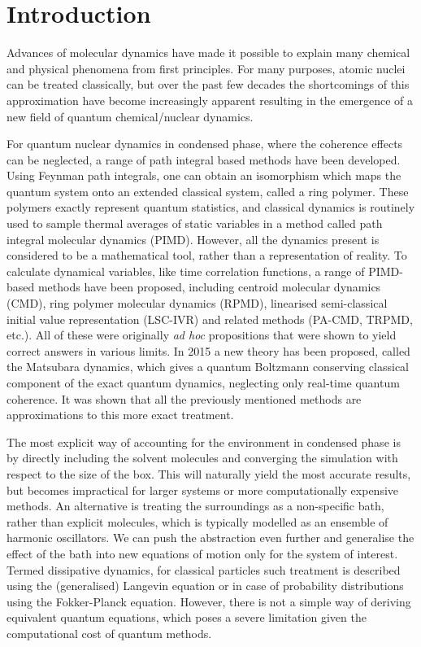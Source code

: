 \chapter{Introduction}
Advances of molecular dynamics have made it possible to explain many chemical and physical phenomena from first principles.\supercite{Tuckerman2010} For many purposes, atomic nuclei can be treated classically, but over the past few decades the shortcomings of this approximation have become increasingly apparent resulting in the emergence of a new field of quantum chemical/nuclear dynamics.\supercite{Markland2018b}
	
For quantum nuclear dynamics in condensed phase, where the coherence effects can be neglected, a range of path integral based methods have been developed. Using Feynman path integrals, one can obtain an isomorphism which maps the quantum system onto an extended classical system, called a ring polymer.\supercite{Feynman2010} These polymers exactly represent quantum statistics, and classical dynamics is routinely used to sample thermal averages of static variables in a method called path integral molecular dynamics (PIMD).\supercite{Tuckerman2010} However, all the dynamics present is considered to be a mathematical tool, rather than a representation of reality. To calculate dynamical variables, like time correlation functions, a range of PIMD-based methods have been proposed, including centroid molecular dynamics (CMD),\supercite{Cao1994h, Jang1999a} ring polymer molecular dynamics (RPMD),\supercite{Craig2004} linearised semi-classical initial value representation (LSC-IVR)\supercite{Wang1998} and related methods (PA-CMD, TRPMD, etc.).\supercite{Markland2018b} All of these were originally \emph{ad hoc} propositions that were shown to yield correct answers in various limits. In 2015 a new theory has been proposed, called the Matsubara dynamics, which gives a quantum Boltzmann conserving classical component of the exact quantum dynamics, neglecting only real-time quantum coherence. It was shown that all the previously mentioned methods are approximations to this more exact treatment.\supercite{Hele2015,Hele2015a}

The most explicit way of accounting for the environment in condensed phase is by directly including the solvent molecules and converging the simulation with respect to the size of the box. This will naturally yield the most accurate results, but becomes impractical for larger systems or more computationally expensive methods.\supercite{Frenkel1996} An alternative is treating the surroundings as a non-specific bath, rather than explicit molecules, which is typically modelled as an ensemble of harmonic oscillators. We can push the abstraction even further and generalise the effect of the bath into new equations of motion only for the system of interest. Termed dissipative dynamics, for classical particles such treatment is described using the (generalised) Langevin equation or in case of probability distributions using the Fokker-Planck equation.\supercite{Weiss2012, Nitzan2013} However, there is not a simple way of deriving equivalent quantum equations, which poses a severe limitation given the computational cost of quantum methods.

